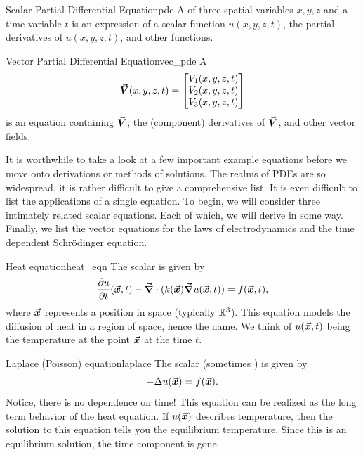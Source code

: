         \begin{df}{Scalar Partial Differential Equation}{pde}
        A  of three spatial variables $x,y,z$ and a time variable $t$ is an expression of a scalar function $u(x,y,z,t)$, the partial derivatives of $u(x,y,z,t)$, and other functions.
        \end{df}
        
        \begin{df}{Vector Partial Differential Equation}{vec_pde}
        A 
        \[
        \boldsymbol{\vec{V}}(x,y,z,t) = \begin{bmatrix} V_1(x,y,z,t) \\ V_2(x,y,z,t) \\ V_3(x,y,z,t) \end{bmatrix}
        \]
        is an equation containing $\boldsymbol{\vec{V}}$, the (component) derivatives of $\boldsymbol{\vec{V}}$, and other vector fields.
        \end{df}
        
        It is worthwhile to take a look at a few important example equations before we move onto derivations or methods of solutions. The realms of PDEs are so widespread, it is rather difficult to give a comprehensive list. It is even difficult to list the applications of a single equation. To begin, we will consider three intimately related scalar equations. Each of which, we will derive in some way. Finally, we list the vector equations for the laws of electrodynamics and the time dependent Schr\"odinger equation.

        
        \begin{ex}{Heat equation}{heat_eqn}
        The scalar  is given by
        \begin{equation}
        \label{eq:heat_eqn}
        \frac{\partial u}{\partial t}(\boldsymbol{\vec{x}},t) -\boldsymbol{\vec{\nabla}} \cdot (k(\boldsymbol{\vec{x}})\boldsymbol{\vec{\nabla}} u(\boldsymbol{\vec{x}},t)) = f(\boldsymbol{\vec{x}},t),
        \end{equation}
        where $\boldsymbol{\vec{x}}$ represents a position in space (typically $\mathbb{R}^3$). This equation models the diffusion of heat in a region of space, hence the name. We think of $u(\boldsymbol{\vec{x}},t)$ being the temperature at the point $\boldsymbol{\vec{x}}$ at the time $t$.
        \end{ex}
        
        \begin{ex}{Laplace (Poisson) equation}{laplace}
        The scalar  (sometimes )  is given by
        \begin{equation}
        \label{eq:laplace_eqn}
        -\Delta u(\boldsymbol{\vec{x}}) = f(\boldsymbol{\vec{x}}).
        \end{equation}
        Notice, there is no dependence on time! This equation can be realized as the long term behavior of the heat equation.  If $u(\boldsymbol{\vec{x}})$ describes temperature, then the solution to this equation tells you the equilibrium temperature. Since this is an equilibrium solution, the time component is gone.
        \end{ex}
        
